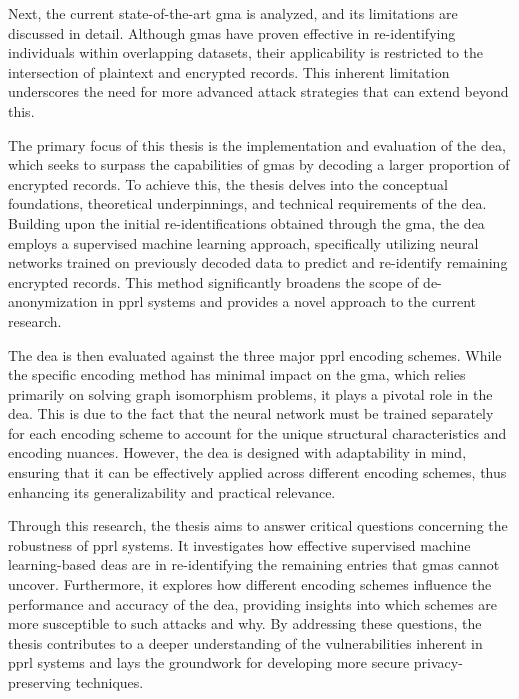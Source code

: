 Next, the current state-of-the-art \ac{gma} is analyzed, and its limitations are discussed in detail. 
Although \ac{gma}s have proven effective in re-identifying individuals within overlapping datasets, their applicability is restricted to the intersection of plaintext and encrypted records. 
This inherent limitation underscores the need for more advanced attack strategies that can extend beyond this.

The primary focus of this thesis is the implementation and evaluation of the \ac{dea}, which seeks to surpass the capabilities of \ac{gma}s by decoding a larger proportion of encrypted records. 
To achieve this, the thesis delves into the conceptual foundations, theoretical underpinnings, and technical requirements of the \ac{dea}. 
Building upon the initial re-identifications obtained through the \ac{gma}, the \ac{dea} employs a supervised machine learning approach, specifically utilizing neural networks trained on previously decoded data to predict and re-identify remaining encrypted records. 
This method significantly broadens the scope of de-anonymization in \ac{pprl} systems and provides a novel approach to the current research.

The \ac{dea} is then evaluated against the three major \ac{pprl} encoding schemes. 
While the specific encoding method has minimal impact on the \ac{gma}, which relies primarily on solving graph isomorphism problems, it plays a pivotal role in the \ac{dea}. 
This is due to the fact that the neural network must be trained separately for each encoding scheme to account for the unique structural characteristics and encoding nuances. 
However, the \ac{dea} is designed with adaptability in mind, ensuring that it can be effectively applied across different encoding schemes, thus enhancing its generalizability and practical relevance.

Through this research, the thesis aims to answer critical questions concerning the robustness of \ac{pprl} systems. 
It investigates how effective supervised machine learning-based \ac{dea}s are in re-identifying the remaining entries that \ac{gma}s cannot uncover.
Furthermore, it explores how different encoding schemes influence the performance and accuracy of the \ac{dea}, providing insights into which schemes are more susceptible to such attacks and why. 
By addressing these questions, the thesis contributes to a deeper understanding of the vulnerabilities inherent in \ac{pprl} systems and lays the groundwork for developing more secure privacy-preserving techniques.




